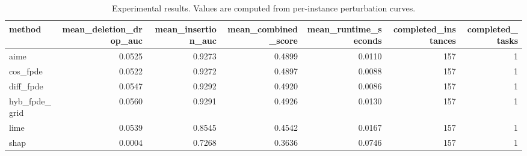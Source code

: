 \begin{table}[t]
\caption{Experimental results. Values are computed from per-instance perturbation curves.}
\label{tab:main_results_computed}
\centering
\begin{tabular}{lrrrrrr}
\toprule
method & mean\_deletion\_drop\_auc & mean\_insertion\_auc & mean\_combined\_score & mean\_runtime\_seconds & completed\_instances & completed\_tasks \\
\midrule
aime & 0.0525 & 0.9273 & 0.4899 & 0.0110 & 157 & 1 \\
cos\_fpde & 0.0522 & 0.9272 & 0.4897 & 0.0088 & 157 & 1 \\
diff\_fpde & 0.0547 & 0.9292 & 0.4920 & 0.0086 & 157 & 1 \\
hyb\_fpde\_grid & 0.0560 & 0.9291 & 0.4926 & 0.0130 & 157 & 1 \\
lime & 0.0539 & 0.8545 & 0.4542 & 0.0167 & 157 & 1 \\
shap & 0.0004 & 0.7268 & 0.3636 & 0.0746 & 157 & 1 \\
\bottomrule
\end{tabular}

\end{table}
